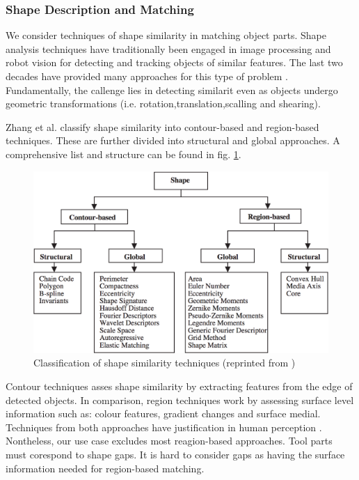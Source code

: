 \documentclass[11]{article}
\begin{document}
\subsubsection{Shape Description and Matching}

We consider techniques of shape similarity in matching object parts. Shape analysis techniques have traditionally been engaged in image processing and robot vision for detecting and tracking objects of similar features. The last two decades have provided many approaches for this type of problem \cite{loncaric1998,zhang2004,veltkamp2001,robert2012}. Fundamentally, the callenge lies in detecting similarit even as objects undergo geometric transformations (i.e. rotation,translation,scalling and shearing).     

Zhang\cite{zhang2004} et al. classify shape similarity into contour-based and region-based techniques. These are further divided into structural and global approaches. A comprehensive list and structure can be found in fig. \ref{fig:shape_similarity}.

\begin{figure}[h]
  \centering
  \includegraphics[width=1\textwidth]{./figures/similarity_techniques.png}
  \caption{Classification of shape similarity techniques (reprinted from \cite{zhang2004})}
  \label{fig:shape_similarity}
\end{figure}  

Contour techniques asses shape similarity by extracting features from the edge of detected objects. In comparison, region techniques work by assessing surface level information such as: colour features, gradient changes and surface medial. Techniques from both approaches have justification in human perception \cite{chatbri2016}. Nontheless, our use case excludes most reagion-based approaches. Tool parts must corespond to shape gaps. It is hard to consider gaps as having the surface information needed for region-based matching.
\end{document}
